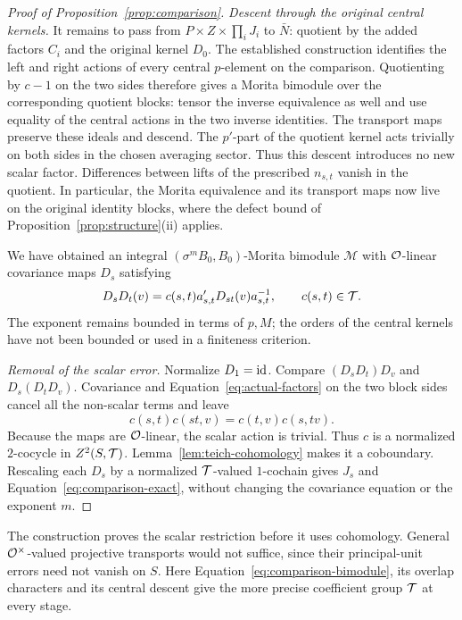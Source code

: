 \begin{proof}[Proof of Proposition~\ref{prop:comparison}]
\emph{Descent through the original central kernels.}
It remains to pass from $P\times Z\times\prod_i J_i$ to
$\bar N$: quotient by the added factors $C_i$ and the original
kernel $D_0$.  The established construction
identifies the left and right actions of every central $p$-element
on the comparison.  Quotienting by $c-1$ on the two sides
therefore gives a Morita bimodule over the corresponding quotient
blocks: tensor the inverse equivalence as well and use equality
of the central actions in the two inverse identities.  The
transport maps preserve these ideals and descend.  The
$p'$-part of the quotient kernel acts trivially on both sides in
the chosen averaging sector.  Thus this descent introduces no
new scalar factor.  Differences between lifts of the prescribed
$n_{s,t}$ vanish in the quotient.
In particular, the Morita equivalence and its transport maps now
live on the original identity blocks, where the defect bound of
Proposition~\ref{prop:structure}(ii) applies.

We have obtained an integral $(\sigma^m B_0,B_0)$-Morita
bimodule $\mathcal M$ with $\mathcal O$-linear covariance maps $D_s$
satisfying
\begin{equation}\label{eq:projective-comparison}
 D_sD_t(v)=c(s,t)a'_{s,t}D_{st}(v)a_{s,t}^{-1},
 \qquad c(s,t)\in\mathcal T.
\end{equation}
The exponent remains bounded in terms of $p,M$; the orders of
the central kernels have not been bounded or used in a finiteness
criterion.

\emph{Removal of the scalar error.}
Normalize $D_1=\mathrm{id}$.  Compare $(D_sD_t)D_v$ and
$D_s(D_tD_v)$.  Covariance and
Equation~\eqref{eq:actual-factors} on the two block sides cancel
all the non-scalar terms and leave
\[
 c(s,t)c(st,v)=c(t,v)c(s,tv).
\]
Because the maps are $\mathcal O$-linear, the scalar action is trivial.
Thus $c$ is a normalized $2$-cocycle in $Z^2(S,\mathcal T)$.
Lemma~\ref{lem:teich-cohomology} makes it a coboundary.
Rescaling each $D_s$ by a normalized $\mathcal T$-valued $1$-cochain
gives $J_s$ and Equation~\eqref{eq:comparison-exact}, without
changing the covariance equation or the exponent $m$.
\end{proof}

The construction proves the scalar restriction before it uses
cohomology.  General $\mathcal O^\times$-valued projective transports would
not suffice, since their principal-unit errors need not vanish on
$S$.  Here Equation~\eqref{eq:comparison-bimodule}, its overlap
characters and its central descent give the more precise coefficient
group $\mathcal T$ at every stage.
